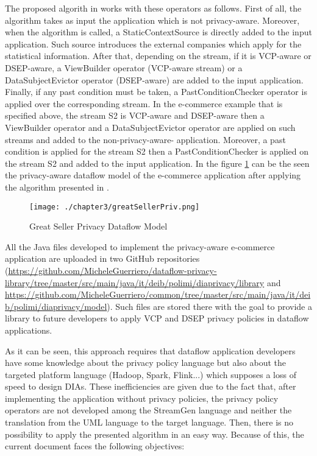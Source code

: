 The proposed algorith in \cite{privacypoliciesarticle} works with these operators as follows. First of all, the algorithm takes as input the application which is not privacy-aware. Moreover, when the algorithm is called, a StaticContextSource is directly added to the input application. Such source introduces the external companies which apply for the statistical information. After that, depending on the stream, if it is VCP-aware or DSEP-aware, a ViewBuilder operator (VCP-aware stream) or a DataSubjectEvictor operator (DSEP-aware) are added to the input application. Finally, if any past condition must be taken, a PastConditionChecker operator is applied over the corresponding stream. In the e-commerce example that is specified above, the stream S2 is VCP-aware and DSEP-aware then a ViewBuilder operator and a DataSubjectEvictor operator are applied on such streams and added to the non-privacy-aware- application. Moreover, a past condition is applied for the stream S2 then a PastConditionChecker is applied on the stream S2 and added to the input application. In the figure \ref{fig:Great Seller Privacy Dataflow Model} can be the seen the privacy-aware dataflow model of the e-commerce application after applying the algorithm presented in \cite{privacypoliciesarticle}.

\begin{figure}
\centering
{\texttt{[image: ./chapter3/greatSellerPriv.png]}}
\caption{Great Seller Privacy Dataflow Model}
\label{fig:Great Seller Privacy Dataflow Model}
\end{figure}

All the Java files developed to implement the privacy-aware e-commerce application are uploaded in two GitHub repositories (\url{https://github.com/MicheleGuerriero/dataflow-privacy-library/tree/master/src/main/java/it/deib/polimi/diaprivacy/library} and \url{https://github.com/MicheleGuerriero/common/tree/master/src/main/java/it/deib/polimi/diaprivacy/model}). Such files are stored there with the goal to provide a library to future developers to apply VCP and DSEP privacy policies in dataflow applications.

As it can be seen, this approach requires that dataflow application developers have some knowledge about the privacy policy language but also about the targeted platform language (Hadoop, Spark, Flink...) which supposes a loss of speed to design DIAs. These inefficiencies are given due to the fact that, after implementing the application without privacy policies, the privacy policy operators are not developed among the StreamGen language and neither the translation from the UML language to the target language. Then, there is no possibility to apply the presented algorithm in an easy way. Because of this, the current document faces the following objectives:

